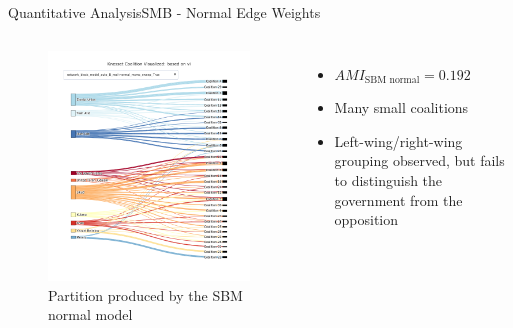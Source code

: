 \documentclass[xcolor=dvipsnames]{beamer}
\newcommand{\AMI}{\mathit{AMI}}
\begin{document}
\begin{frame}{Quantitative Analysis}{SMB - Normal Edge Weights}
  \small
  \begin{columns}
  \begin{figure}
    \includegraphics[width=\linewidth]{sbm_norm}
    \caption[Partition visualization: SBM normal model]{Partition produced by the SBM normal model}
  \end{figure}
  \begin{itemize}
    \item $\AMI_{\text{SBM normal}} = 0.192$
    \item Many small coalitions
    \item Left-wing/right-wing grouping observed, but fails to distinguish the government from the opposition
  \end{itemize}
  \end{columns}
\end{frame}
\end{document}
